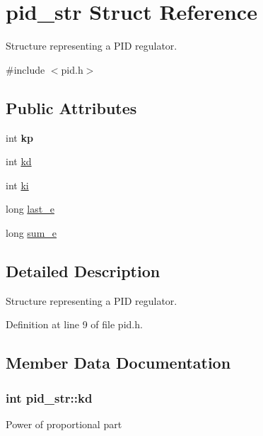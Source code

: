 \hypertarget{structpid__str}{
\section{pid\_\-str Struct Reference}
\label{structpid__str}
}


Structure representing a PID regulator.  




{\ttfamily \#include $<$pid.h$>$}

\subsection*{Public Attributes}
\begin{DoxyCompactItemize}
\item 
\hypertarget{structpid__str_a7c039d6ba7d0cc9d03fe3631f5ee5811}{
int {\bfseries kp}}
\label{structpid__str_a7c039d6ba7d0cc9d03fe3631f5ee5811}

\item 
int \hyperlink{structpid__str_a0f9566f4e143fbbf1a8c4f3ab920f7cb}{kd}
\item 
int \hyperlink{structpid__str_a1246caf4496665d0d9122ae001e9bbea}{ki}
\item 
long \hyperlink{structpid__str_afba88804d3ae4faf2c06e0199d553745}{last\_\-e}
\item 
long \hyperlink{structpid__str_ab5da6edeb8d607bf45f9be8330079120}{sum\_\-e}
\end{DoxyCompactItemize}


\subsection{Detailed Description}
Structure representing a PID regulator. 

Definition at line 9 of file pid.h.



\subsection{Member Data Documentation}
\hypertarget{structpid__str_a0f9566f4e143fbbf1a8c4f3ab920f7cb}{
\subsubsection[{kd}]{\setlength{\rightskip}{0pt plus 5cm}int {\bf pid\_\-str::kd}}}
\label{structpid__str_a0f9566f4e143fbbf1a8c4f3ab920f7cb}
Power of proportional part 

